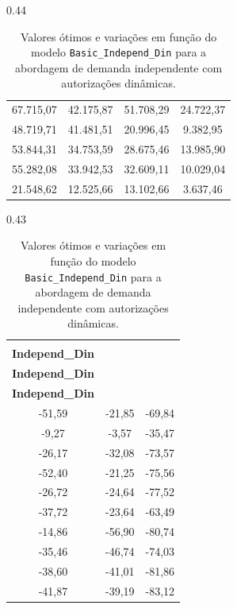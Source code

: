 \begin{table}[H]
\begin{subtable}[t]{0.44\textwidth}
\begin{tabular}{@{}cccc@{}}
			67.715,07  & 42.175,87                       & 51.708,29  & 24.722,37  \\
			48.719,71  & 41.481,51                       & 20.996,45  & 9.382,95   \\
			53.844,31  & 34.753,59                       & 28.675,46  & 13.985,90  \\
			55.282,08  & 33.942,53                       & 32.609,11  & 10.029,04  \\
			21.548,62  & 12.525,66                       & 13.102,66  & 3.637,46   \\
			\bottomrule
		\end{tabular}
		\caption{Z* (\$)}
	\end{subtable}
	\hfill
	\begin{subtable}[t]{0.43\textwidth}
		\centering
		\begin{tabular}{@{}ccc@{}}
			\toprule
			\makecell[c]{\textbf{Fulfill\_}                  \\\textbf{Independ\_Din}}
			       & \makecell[c]{\textbf{Skipla\_}          \\\textbf{Independ\_Din}}
			       & \makecell[c]{\textbf{Comp\_}            \\\textbf{Independ\_Din}} \\
			\midrule
			-51,59 & -21,85                         & -69,84 \\
			-9,27  & -3,57                          & -35,47 \\
			-26,17 & -32,08                         & -73,57 \\
			-52,40 & -21,25                         & -75,56 \\
			-26,72 & -24,64                         & -77,52 \\
			-37,72 & -23,64                         & -63,49 \\
			-14,86 & -56,90                         & -80,74 \\
			-35,46 & -46,74                         & -74,03 \\
			-38,60 & -41,01                         & -81,86 \\
			-41,87 & -39,19                         & -83,12 \\
			\bottomrule
		\end{tabular}
		\caption{Variação das diferenças no Z* (\%)}
	\end{subtable}

	\caption{Valores ótimos e variações em função do modelo \texttt{Basic\_Independ\_Din} para a abordagem de demanda independente com autorizações dinâmicas.}
	\label{tab: tab_Basic_Independ_Din}
\end{table}

